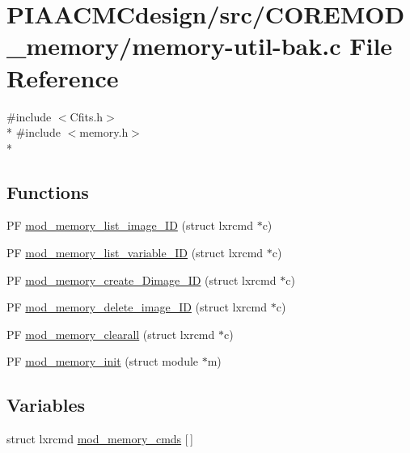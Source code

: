 \hypertarget{PIAACMCdesign_2src_2COREMOD__memory_2memory-util-bak_8c}{\section{P\+I\+A\+A\+C\+M\+Cdesign/src/\+C\+O\+R\+E\+M\+O\+D\+\_\+memory/memory-\/util-\/bak.c File Reference}
\label{PIAACMCdesign_2src_2COREMOD__memory_2memory-util-bak_8c}
}
{\ttfamily \#include $<$Cfits.\+h$>$}\\*
{\ttfamily \#include $<$memory.\+h$>$}\\*
\subsection*{Functions}
\begin{DoxyCompactItemize}
\item 
P\+F \hyperlink{PIAACMCdesign_2src_2COREMOD__memory_2memory-util-bak_8c_a726a603084661cdde9804771ed4effbd}{mod\+\_\+memory\+\_\+list\+\_\+image\+\_\+\+I\+D} (struct lxrcmd $\ast$c)
\item 
P\+F \hyperlink{PIAACMCdesign_2src_2COREMOD__memory_2memory-util-bak_8c_a2c9d01f20eaa6f60dad3250105d7a5ee}{mod\+\_\+memory\+\_\+list\+\_\+variable\+\_\+\+I\+D} (struct lxrcmd $\ast$c)
\item 
P\+F \hyperlink{PIAACMCdesign_2src_2COREMOD__memory_2memory-util-bak_8c_a568ab756155971ba66789611996a13e4}{mod\+\_\+memory\+\_\+create\+\_\+Dimage\+\_\+\+I\+D} (struct lxrcmd $\ast$c)
\item 
P\+F \hyperlink{PIAACMCdesign_2src_2COREMOD__memory_2memory-util-bak_8c_abc825a2ddf37777ae6925b242fdaac8f}{mod\+\_\+memory\+\_\+delete\+\_\+image\+\_\+\+I\+D} (struct lxrcmd $\ast$c)
\item 
P\+F \hyperlink{PIAACMCdesign_2src_2COREMOD__memory_2memory-util-bak_8c_a6ca5475168daaf1a7e36283ccbec5856}{mod\+\_\+memory\+\_\+clearall} (struct lxrcmd $\ast$c)
\item 
P\+F \hyperlink{PIAACMCdesign_2src_2COREMOD__memory_2memory-util-bak_8c_a40ae03fec034d9ae5dd46beeb878dc65}{mod\+\_\+memory\+\_\+init} (struct module $\ast$m)
\end{DoxyCompactItemize}
\subsection*{Variables}
\begin{DoxyCompactItemize}
\item 
struct lxrcmd \hyperlink{PIAACMCdesign_2src_2COREMOD__memory_2memory-util-bak_8c_a2cf116839ba2fdb2d9fed443b032d1ca}{mod\+\_\+memory\+\_\+cmds} \mbox{[}$\,$\mbox{]}
\end{DoxyCompactItemize}


